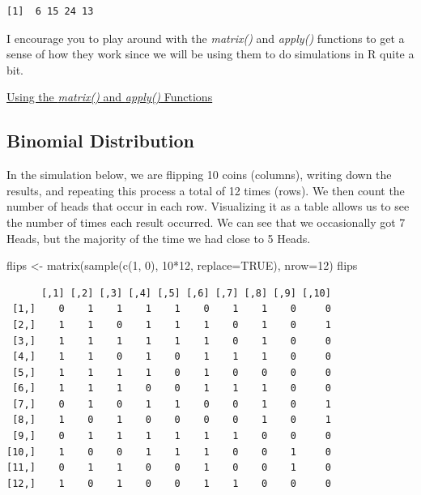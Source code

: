 \documentclass[
  letterpaper,
  DIV=11,
  numbers=noendperiod]{scrreprt}
\newenvironment{Shaded}{\begin{snugshade}}{\end{snugshade}}
\newcommand{\AttributeTok}[1]{\textcolor[rgb]{0.40,0.45,0.13}{#1}}
\newcommand{\ConstantTok}[1]{\textcolor[rgb]{0.56,0.35,0.01}{#1}}
\newcommand{\DecValTok}[1]{\textcolor[rgb]{0.68,0.00,0.00}{#1}}
\newcommand{\FunctionTok}[1]{\textcolor[rgb]{0.28,0.35,0.67}{#1}}
\newcommand{\NormalTok}[1]{\textcolor[rgb]{0.00,0.23,0.31}{#1}}
\newcommand{\OtherTok}[1]{\textcolor[rgb]{0.00,0.23,0.31}{#1}}
\newcommand{\SpecialCharTok}[1]{\textcolor[rgb]{0.37,0.37,0.37}{#1}}
\begin{document}
\begin{verbatim}
[1]  6 15 24 13
\end{verbatim}

I encourage you to play around with the \emph{matrix()} and
\emph{apply()} functions to get a sense of how they work since we will
be using them to do simulations in R quite a bit.

\begin{watch}{}{}
    \href{https://youtu.be/pc5_0-_KRuo}{Using the \textit{matrix()} and \textit{apply()} Functions}
\end{watch}

\subsection{Binomial Distribution}\label{binomial-distribution}

In the simulation below, we are flipping 10 coins (columns), writing
down the results, and repeating this process a total of 12 times (rows).
We then count the number of heads that occur in each row. Visualizing it
as a table allows us to see the number of times each result occurred. We
can see that we occasionally got 7 Heads, but the majority of the time
we had close to 5 Heads.

\begin{Shaded}
\begin{Highlighting}[]
\NormalTok{flips }\OtherTok{\textless{}{-}} \FunctionTok{matrix}\NormalTok{(}\FunctionTok{sample}\NormalTok{(}\FunctionTok{c}\NormalTok{(}\DecValTok{1}\NormalTok{, }\DecValTok{0}\NormalTok{), }\DecValTok{10}\SpecialCharTok{*}\DecValTok{12}\NormalTok{, }\AttributeTok{replace=}\ConstantTok{TRUE}\NormalTok{), }\AttributeTok{nrow=}\DecValTok{12}\NormalTok{)}
\NormalTok{flips}
\end{Highlighting}
\end{Shaded}

\begin{verbatim}
      [,1] [,2] [,3] [,4] [,5] [,6] [,7] [,8] [,9] [,10]
 [1,]    0    1    1    1    1    0    1    1    0     0
 [2,]    1    1    0    1    1    1    0    1    0     1
 [3,]    1    1    1    1    1    1    0    1    0     0
 [4,]    1    1    0    1    0    1    1    1    0     0
 [5,]    1    1    1    1    0    1    0    0    0     0
 [6,]    1    1    1    0    0    1    1    1    0     0
 [7,]    0    1    0    1    1    0    0    1    0     1
 [8,]    1    0    1    0    0    0    0    1    0     1
 [9,]    0    1    1    1    1    1    1    0    0     0
[10,]    1    0    0    1    1    1    0    0    1     0
[11,]    0    1    1    0    0    1    0    0    1     0
[12,]    1    0    1    0    0    1    1    0    0     0
\end{verbatim}
\end{document}
